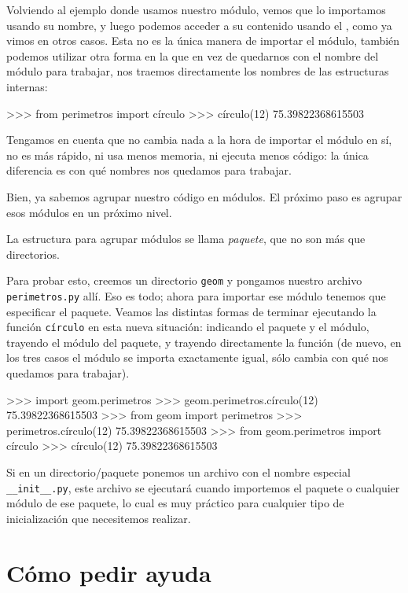 Volviendo al ejemplo donde usamos nuestro módulo, vemos que lo importamos usando su nombre, y luego podemos acceder a su contenido usando el , como ya vimos en otros casos. Esta no es la única manera de importar el módulo, también podemos utilizar otra forma en la que en vez de quedarnos con el nombre del módulo para trabajar, nos traemos directamente los nombres de las estructuras internas:

\begin{py}  
>>> from perimetros import círculo
>>> círculo(12)
75.39822368615503
\end{py}

Tengamos en cuenta que no cambia nada a la hora de importar el módulo en sí, no es más rápido, ni usa menos memoria, ni ejecuta menos código: la única diferencia es con qué nombres nos quedamos para trabajar.

Bien, ya sabemos agrupar nuestro código en módulos. El próximo paso es agrupar esos módulos en un próximo nivel.

La estructura para agrupar módulos se llama \textit{paquete}, que no son más que directorios.

Para probar esto, creemos un directorio \texttt{geom} y pongamos nuestro archivo \texttt{perimetros.py} allí. Eso es todo; ahora para importar ese módulo tenemos que especificar el paquete. Veamos las distintas formas de terminar ejecutando la función \texttt{círculo} en esta nueva situación: indicando el paquete y el módulo, trayendo el módulo del paquete, y trayendo directamente la función (de nuevo, en los tres casos el módulo se importa exactamente igual, sólo cambia con qué nos quedamos para trabajar).

\begin{py}  
>>> import geom.perimetros
>>> geom.perimetros.círculo(12)
75.39822368615503
>>> from geom import perimetros
>>> perimetros.círculo(12)
75.39822368615503
>>> from geom.perimetros import círculo
>>> círculo(12)
75.39822368615503
\end{py}

Si en un directorio/paquete ponemos un archivo con el nombre especial \texttt{\_\_init\_\_.py}, este archivo se ejecutará cuando importemos el paquete o cualquier módulo de ese paquete, lo cual es muy práctico para cualquier tipo de inicialización que necesitemos realizar.


\section{Cómo pedir ayuda}

